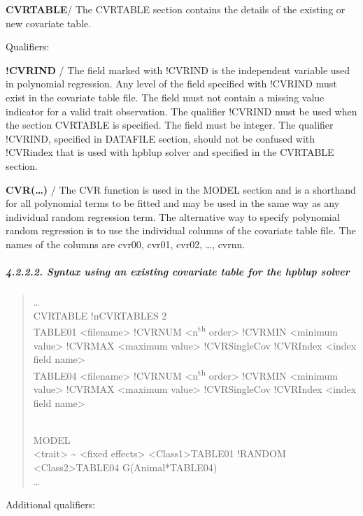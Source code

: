 \textbf{CVRTABLE}/ The CVRTABLE section contains the details of the
existing or new covariate table.

Qualifiers:

\textbf{!CVRIND} / The field marked with !CVRIND is the independent
variable used in polynomial regression. Any level of the field specified
with !CVRIND must exist in the covariate table file. The field must not
contain a missing value indicator for a valid trait observation. The
qualifier !CVRIND must be used when the section CVRTABLE is specified.
The field must be integer. The qualifier !CVRIND, specified in DATAFILE
section, should not be confused with !CVRindex that is used with hpblup
solver and specified in the CVRTABLE section.

\textbf{CVR(\ldots)} / The CVR function is used in the MODEL section and
is a shorthand for all polynomial terms to be fitted and may be used in
the same way as any individual random regression term. The alternative
way to specify polynomial random regression is to use the individual
columns of the covariate table file. The names of the columns are cvr00,
cvr01, cvr02, \ldots, cvrnn.

\subparagraph{4.2.2.2. Syntax using an existing covariate table for the
hpblup solver}\label{Obse11}

\begin{quote}
\ldots{}\\
CVRTABLE !nCVRTABLES 2\\
TABLE01 \textless filename\textgreater{} !CVRNUM
\textless n\textsuperscript{th} order\textgreater{} !CVRMIN
\textless minimum value\textgreater{} !CVRMAX \textless maximum
value\textgreater{} !CVRSingleCov !CVRIndex \textless index field
name\textgreater{}\\
TABLE04 \textless filename\textgreater{} !CVRNUM
\textless n\textsuperscript{th} order\textgreater{} !CVRMIN
\textless minimum value\textgreater{} !CVRMAX \textless maximum
value\textgreater{} !CVRSingleCov !CVRIndex \textless index field
name\textgreater{}\\
\strut \\
MODEL\\
\textless trait\textgreater{} \textasciitilde{} \textless fixed
effects\textgreater{} \textless Class1\textgreater*TABLE01 !RANDOM
\textless Class2\textgreater*TABLE04 G(Animal*TABLE04)\\
\ldots{}
\end{quote}

Additional qualifiers:

